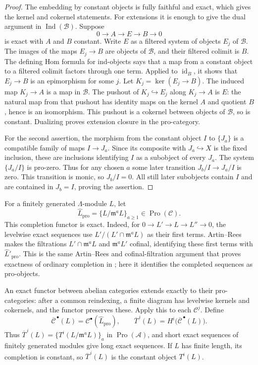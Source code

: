 \begin{proof}
The embedding by constant objects is fully faithful and exact, which
gives the kernel and cokernel statements.  For extensions it is enough
to give the dual argument in $\operatorname{Ind}(\mathcal B)$.
Suppose
\[
 0\longrightarrow A\longrightarrow E\longrightarrow B
 \longrightarrow0
\]
is exact with $A$ and $B$ constant.  Write $E$ as a filtered system
of objects $E_j$ of $\mathcal B$.  The images of the maps
$E_j\to B$ are objects of $\mathcal B$, and their filtered colimit
is $B$.  The defining Hom formula for ind-objects says that a map
from a constant object to a filtered colimit factors through one
term.  Applied to $\operatorname{id}_B$, it shows that
$E_j\to B$ is an epimorphism for some $j$.  Let
$K_j=\ker(E_j\to B)$.  The induced map $K_j\to A$ is a map in
$\mathcal B$.  The pushout of
$K_j\hookrightarrow E_j$ along $K_j\to A$ is $E$: the natural map
from that pushout has identity maps on the kernel $A$ and quotient
$B$, hence is an isomorphism.  This pushout is a cokernel between
objects of $\mathcal B$, so is constant.  Dualizing proves extension
closure in the pro-category.

For the second assertion, the morphism from the constant object $I$
to $\{J_a\}$ is a compatible family of maps $I\to J_a$.  Since its
composite with $J_a\hookrightarrow X$ is the fixed inclusion, these
are inclusions identifying $I$ as a subobject of every $J_a$.
The system $\{J_a/I\}$ is pro-zero.  Thus for any chosen $a$ some
later transition $J_b/I\to J_a/I$ is zero.  This transition is
monic, so $J_b/I=0$.  All still later subobjects contain $I$ and are
contained in $J_b=I$, proving the assertion.
\end{proof}

For a finitely generated $\Lambda$-module $L$, let
\[
 \widehat L_{\mathrm{pro}}
       =\{L/\mathfrak m^aL\}_{a\geq1}
       \in\operatorname{Pro}(\mathcal C).
\]
This completion functor is exact.  Indeed, for
$0\to L'\to L\to L''\to0$, the levelwise exact sequences use
$L'/(L'\cap\mathfrak m^aL)$ as their first terms.  Artin--Rees
makes the filtrations $L'\cap\mathfrak m^aL$ and
$\mathfrak m^aL'$ cofinal, identifying these first terms with
$\widehat L'_{\mathrm{pro}}$.
This is the same Artin--Rees and cofinal-filtration argument that
proves exactness of ordinary completion in \cite[Tag 00MA]{stacks};
here it identifies the completed sequences as pro-objects.

An exact functor between abelian categories extends exactly to their
pro-categories: after a common reindexing, a finite diagram has
levelwise kernels and cokernels, and the functor preserves these.
Apply this to each $\mathcal C^j$.  Define
\[
 \overline{\mathcal C}^{\,\bullet}(L)
      =\mathcal C^\bullet(\widehat L_{\mathrm{pro}}),
 \qquad
 \overline T^{\,i}(L)
      =H^i\bigl(\overline{\mathcal C}^{\,\bullet}(L)\bigr).
\]
Thus
$\overline T^{\,i}(L)=\{T^i(L/\mathfrak m^aL)\}_a$ in
$\operatorname{Pro}(\mathcal A)$, and short exact sequences of
finitely generated modules give long exact sequences.  If $L$ has
finite length, its completion is constant, so
$\overline T^{\,i}(L)$ is the constant object $T^i(L)$.

